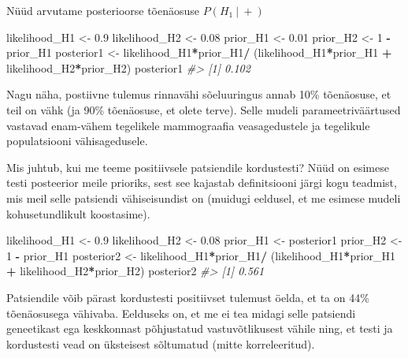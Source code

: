 \documentclass[]{book}
\newenvironment{Shaded}{\begin{snugshade}}{\end{snugshade}}
\newcommand{\CommentTok}[1]{\textcolor[rgb]{0.56,0.35,0.01}{\textit{#1}}}
\newcommand{\DecValTok}[1]{\textcolor[rgb]{0.00,0.00,0.81}{#1}}
\newcommand{\FloatTok}[1]{\textcolor[rgb]{0.00,0.00,0.81}{#1}}
\newcommand{\NormalTok}[1]{#1}
\newcommand{\OperatorTok}[1]{\textcolor[rgb]{0.81,0.36,0.00}{\textbf{#1}}}
\newcommand{\StringTok}[1]{\textcolor[rgb]{0.31,0.60,0.02}{#1}}
\begin{document}
Nüüd arvutame posterioorse tõenäosuse \(P(H_1~\vert~+)\)

\begin{Shaded}
\begin{Highlighting}[]
\NormalTok{likelihood_H1 <-}\StringTok{ }\FloatTok{0.9}
\NormalTok{likelihood_H2 <-}\StringTok{ }\FloatTok{0.08}
\NormalTok{prior_H1 <-}\StringTok{ }\FloatTok{0.01}
\NormalTok{prior_H2 <-}\StringTok{ }\DecValTok{1} \OperatorTok{-}\StringTok{ }\NormalTok{prior_H1}
\NormalTok{posterior1 <-}\StringTok{ }\NormalTok{likelihood_H1}\OperatorTok{*}\NormalTok{prior_H1}\OperatorTok{/}
\StringTok{  }\NormalTok{(likelihood_H1}\OperatorTok{*}\NormalTok{prior_H1 }\OperatorTok{+}\StringTok{ }
\StringTok{     }\NormalTok{likelihood_H2}\OperatorTok{*}\NormalTok{prior_H2)}
\NormalTok{posterior1}
\CommentTok{#> [1] 0.102}
\end{Highlighting}
\end{Shaded}

Nagu näha, postiivne tulemus rinnavähi sõeluuringus annab 10\% tõenäosuse, et teil on vähk (ja 90\% tõenäosuse, et olete terve).
Selle mudeli parameetriväärtused vastavad enam-vähem tegelikele mammograafia veasagedustele ja tegelikule populatsiooni vähisagedusele.

Mis juhtub, kui me teeme positiivsele patsiendile kordustesti?
Nüüd on esimese testi posteerior meile prioriks, sest see kajastab definitsiooni järgi kogu teadmist, mis meil selle patsiendi vähiseisundist on (muidugi eeldusel, et me esimese mudeli kohusetundlikult koostasime).

\begin{Shaded}
\begin{Highlighting}[]
\NormalTok{likelihood_H1 <-}\StringTok{ }\FloatTok{0.9}
\NormalTok{likelihood_H2 <-}\StringTok{ }\FloatTok{0.08}
\NormalTok{prior_H1 <-}\StringTok{ }\NormalTok{posterior1}
\NormalTok{prior_H2 <-}\StringTok{ }\DecValTok{1} \OperatorTok{-}\StringTok{ }\NormalTok{prior_H1}
\NormalTok{posterior2 <-}\StringTok{ }\NormalTok{likelihood_H1}\OperatorTok{*}\NormalTok{prior_H1}\OperatorTok{/}
\StringTok{  }\NormalTok{(likelihood_H1}\OperatorTok{*}\NormalTok{prior_H1 }\OperatorTok{+}\StringTok{ }
\StringTok{     }\NormalTok{likelihood_H2}\OperatorTok{*}\NormalTok{prior_H2)}
\NormalTok{posterior2}
\CommentTok{#> [1] 0.561}
\end{Highlighting}
\end{Shaded}

Patsiendile võib pärast kordustesti positiivset tulemust öelda, et ta on 44\% tõenäosusega vähivaba. Eelduseks on, et me ei tea midagi selle patsiendi geneetikast ega keskkonnast põhjustatud vastuvõtlikusest vähile ning, et testi ja kordustesti vead on üksteisest sõltumatud (mitte korreleeritud).
\end{document}

